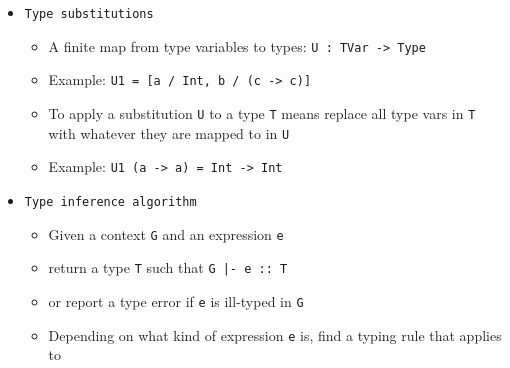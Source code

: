 \documentclass[landscape,8pt]{extarticle}
\newcommand{\code}{\lstinline}
\begin{document}
\begin{multicols}{3}
\begin{itemize}
\begin{itemize}
\begin{itemize}
                                  \begin{lstlisting}
let id = \x -> x in
  let y = id 5 in
    id (\z -> z + y)
\end{lstlisting}
                            \item When we have to pick a type \code{T} for \code{x} we pick a \code{fresh type variable} \code{a}
                            \item So the type of \code{\x -> x} comes out as \code{a -> a}
                            \item We can \code{generalize} this type to \code{forall a . a -> a}
                            \item When we apply \code{id} the first time we \emph{instantiate} this polymorphic type with \code{Int}
                            \item When we apply \code{id} the second time we \emph{instantiate} this polymorphic type with \code{Int -> Int}
                        \end{itemize}
                        \item \code{Type substitutions}
                        \begin{itemize}
                            \item A finite map from type variables to types: \code{U : TVar -> Type}
                            \item Example: \code{U1 = [a / Int, b / (c -> c)]}
                            \item To apply a substitution \code{U} to a type \code{T} means replace all type vars in \code{T} with whatever they are mapped to in \code{U}
                            \item Example: \code{U1 (a -> a) = Int -> Int}
                        \end{itemize}
                        \item \code{Type inference algorithm}
                        \begin{itemize}
                            \item Given a context \code{G} and an expression \code{e}
                            \item return a type \code{T} such that \code{G |- e :: T}
                            \item or report a type error if \code{e} is ill-typed in \code{G}
                            \item Depending on what kind of expression \code{e} is, find a typing rule that applies to

\end{itemize}
\end{itemize}
\end{itemize}
\end{multicols}
\end{document}
